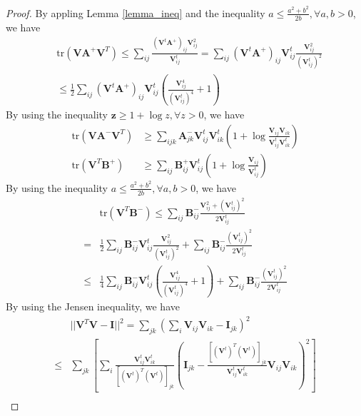 \documentclass[10pt,journal,compsoc]{IEEEtran}
\newcommand{\tr}{\mathrm{tr}}
\begin{document}
\begin{proof}
By appling Lemma \ref{lemma_ineq} and the inequality $a \leq \frac{a^2 + b^2}{2b}, \forall a,b >0$, we have
\begin{align}
&\tr(\mathbf{V} \mathbf{A}^{+} \mathbf{V}^T ) \leq \sum_{ij} \frac{(\mathbf{V}^t \mathbf{A}^{+})_{ij} \mathbf{V}_{ij}^{2}}{\mathbf{V}_{ij}^{t}} = \sum_{ij}(\mathbf{V}^t \mathbf{A}^{+})_{ij} \mathbf{V}_{ij}^{t} \frac{\mathbf{V}_{ij}^{2}}{(\mathbf{V}_{ij}^{t})^2}\nonumber  \\
&\leq \frac{1}{2}\sum_{ij}(\mathbf{V}^t \mathbf{A}^{+})_{ij} \mathbf{V}_{ij}^{t} (\frac{\mathbf{V}_{ij}^{4}}{(\mathbf{V}_{ij}^{t})^4} + 1)
\end{align}
By using the inequality $\mathbf{z} \geq 1 + \log z, \forall z > 0$, we have
\begin{align}
\tr(\mathbf{V} \mathbf{A}^{-} \mathbf{V}^T ) &\geq \sum_{ijk} \mathbf{A}_{jk}^{-} \mathbf{V}_{ij}^{t} \mathbf{V}_{ik}^{t}(1 + \log\frac{\mathbf{V}_{ij} \mathbf{V}_{ik}}{\mathbf{V}_{ij}^t \mathbf{V}_{ik}^t}) \\
\tr(\mathbf{V}^T \mathbf{B}^{+})  &\geq \sum_{ij} \mathbf{B}_{ij}^{+} \mathbf{V}_{ij}^{t}(1 + \log\frac{\mathbf{V}_{ij}}{\mathbf{V}_{ij}^t}) 
\end{align}
By using the inequality $a \leq \frac{a^2 + b^2}{2b}, \forall a,b >0$, we have
\begin{align}
& \tr(\mathbf{V}^T \mathbf{B}^{-}) \leq  \sum_{ij} \mathbf{B}_{ij}^{-} \frac{\mathbf{V}_{ij}^{2} + (\mathbf{V}_{ij}^{t})^{2}}{2\mathbf{V}_{ij}^t} \nonumber \\
=& \frac{1}{2} \sum_{ij} \mathbf{B}_{ij}^{-}\mathbf{V}_{ij}^t \frac{\mathbf{V}_{ij}^2 }{(\mathbf{V}_{ij}^t)^2}  + \sum_{ij} \mathbf{B}_{ij}^{-} \frac{ (\mathbf{V}_{ij}^{t})^{2}}{2\mathbf{V}_{ij}^t} \nonumber \\
\leq& \frac{1}{4} \sum_{ij} \mathbf{B}_{ij}^{-}\mathbf{V}_{ij}^t \left(\frac{\mathbf{V}_{ij}^4 }{(\mathbf{V}_{ij}^t)^4} + 1 \right)  + \sum_{ij} \mathbf{B}_{ij}^{-} \frac{ (\mathbf{V}_{ij}^{t})^{2}}{2\mathbf{V}_{ij}^t} 
\end{align}
By using the Jensen inequality, we have
\begin{align}
&||\mathbf{V}^T \mathbf{V} - \mathbf{I}||^2 = \sum_{jk} (\sum_{i} \mathbf{V}_{ij} \mathbf{V}_{ik} - \mathbf{I}_{jk})^2 \\
\leq& \sum_{jk} \left[ \sum_{i} \frac{ \mathbf{V}_{ij}^{t} \mathbf{V}_{ik}^{t} }{ [(\mathbf{V}^{t})^T(\mathbf{V}^{t})]_{jk}}  \left( \mathbf{I}_{jk} - \frac{[(\mathbf{V}^{t})^T(\mathbf{V}^{t})]_{jk} }{ \mathbf{V}_{ij}^{t} \mathbf{V}_{ik}^{t} } \mathbf{V}_{ij} \mathbf{V}_{ik}  \right)^2  \right] \nonumber   \\

\end{align}
\end{proof}
\end{document}
